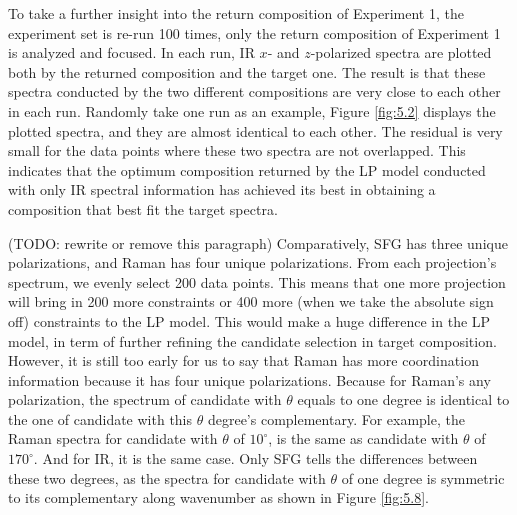 To take a further insight into the return composition of Experiment 1, the experiment set is re-run 100 times, only the return composition of Experiment 1 is analyzed and focused. In each run, IR $x$- and $z$-polarized spectra are plotted both by the returned composition and the target one. The result is that these spectra conducted by the two different compositions are very close to each other in each run. Randomly take one run as an example, Figure \ref{fig:5.2} displays the plotted spectra, and they are almost identical to each other. The residual is very small for the data points where these two spectra are not overlapped. This indicates that the optimum composition returned by the LP model conducted with only IR spectral information has achieved its best in obtaining a composition that best fit the target spectra. 

(TODO: rewrite or remove this paragraph) Comparatively, SFG has three unique polarizations, and Raman has four unique polarizations. From each projection's spectrum, we evenly select 200 data points. This means that one more projection will bring in 200 more constraints or 400 more (when we take the absolute sign off) constraints to the LP model. This would make a huge difference in the LP model, in term of further refining the candidate selection in target composition. However, it is still too early for us to say that Raman has more coordination information because it has four unique polarizations. Because for Raman's any polarization, the spectrum of candidate with $\theta$ equals to one degree is identical to the one of candidate with this $\theta$ degree's complementary. For example, the Raman spectra for candidate with $\theta$ of $10^{\circ}$, is the same as candidate with $\theta$ of $170^{\circ}$. And for IR, it is the same case. Only SFG tells the differences between these two degrees, as the spectra for candidate with $\theta$ of one degree is symmetric to its complementary along wavenumber as shown in Figure \ref{fig:5.8}. \\


